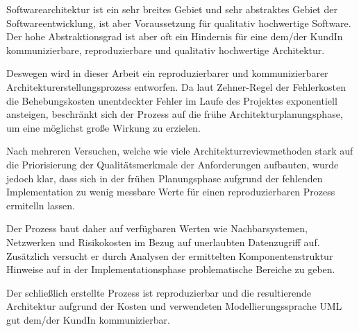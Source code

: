 Softwarearchitektur ist ein sehr breites Gebiet und sehr abstraktes Gebiet der Softwareentwicklung, ist aber Voraussetzung für qualitativ hochwertige Software. Der hohe Abstraktionsgrad ist aber oft ein Hindernis für eine dem/der KundIn kommunizierbare, reproduzierbare und qualitativ hochwertige Architektur.

Deswegen wird in dieser Arbeit ein reproduzierbarer und kommunizierbarer Architekturerstellungsprozess entworfen. Da laut Zehner-Regel der Fehlerkosten die Behebungskosten unentdeckter Fehler im Laufe des Projektes exponentiell ansteigen, beschränkt sich der Prozess auf die frühe Architekturplanungsphase, um eine möglichst große Wirkung zu erzielen.

Nach mehreren Versuchen, welche wie viele Architekturreviewmethoden stark auf die Priorisierung der Qualitätsmerkmale der Anforderungen aufbauten, wurde jedoch klar, dass sich in der frühen Planungsphase aufgrund der fehlenden Implementation zu wenig messbare Werte für einen reproduzierbaren Prozess ermitelln lassen.

Der Prozess baut daher auf verfügbaren Werten wie Nachbarsystemen, Netzwerken und Risikokosten im Bezug auf unerlaubten Datenzugriff auf. Zusätzlich versucht er durch Analysen der ermittelten Komponentenstruktur Hinweise auf in der Implementationsphase problematische Bereiche zu geben.

Der schließlich erstellte Prozess ist reproduzierbar und die resultierende Architektur aufgrund der Kosten und verwendeten Modellierungssprache UML gut dem/der KundIn kommunizierbar.